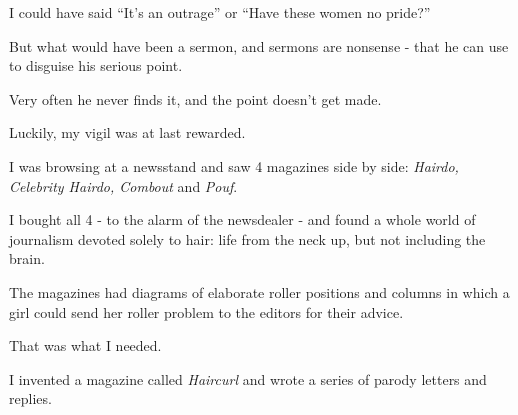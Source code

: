 \documentclass{book}
\numberwithin{equation}{section}
\begin{document}
I could have said ``It's an outrage'' or ``Have these women no pride?''

But what would have been a sermon, and sermons are nonsense - that he can use to disguise his serious point.

Very often he never finds it, and the point doesn't get made.

%
Luckily, my vigil was at last rewarded.

I was browsing at a newsstand and saw 4 magazines side by side: \textit{Hairdo, Celebrity Hairdo, Combout} and \textit{Pouf}.

I bought all 4 - to the alarm of the newsdealer - and found a whole world of journalism devoted solely to hair: life from the neck up, but not including the brain.

The magazines had diagrams of elaborate roller positions and columns in which a girl could send her roller problem to the editors for their advice.

That was what I needed.

I invented a magazine called \textit{Haircurl} and wrote a series of parody letters and replies.
\end{document}
